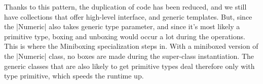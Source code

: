 Thanks to this pattern, the duplication of code has been reduced, and we still have collections that offer high-level interface, and generic templates. But, since the |Numeric| also takes generic type parameter, and since it's most likely a primitive type, boxing and unboxing would occur a lot during the operations. This is where the Miniboxing specialization steps in. With a miniboxed version of the |Numeric| class, no boxes are made during the super-class instantiation. The generic classes that are also likely to get primitive types deal therefore only with type primitive, which speeds the runtime up.